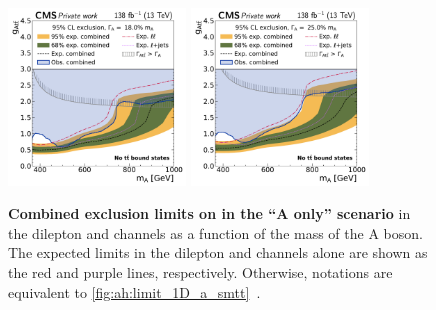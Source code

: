 \begin{figure}[!ph]
    \\
    \includegraphics[width=0.42\textwidth]{figures/ah/limits_combined/smtt/A_limit_w18p0_g-scan.pdf}%
    \hspace*{0.05\textwidth}%
    \includegraphics[width=0.42\textwidth]{figures/ah/limits_combined/smtt/A_limit_w25p0_g-scan.pdf}
    \caption{%
        \textbf{Combined exclusion limits on \gAtt in the ``A only'' scenario} in the dilepton and \ljets channels as a function of the mass of the A boson. The expected limits in the dilepton and \ljets channels alone are shown as the red and purple lines, respectively. Otherwise, notations are equivalent to \cref{fig:ah:limit_1D_a_smtt}~\cite{CMS:HIG-22-013}.
    }
    \label{fig:ah:limit_1D_a_smtt_lx}
\end{figure}
    
